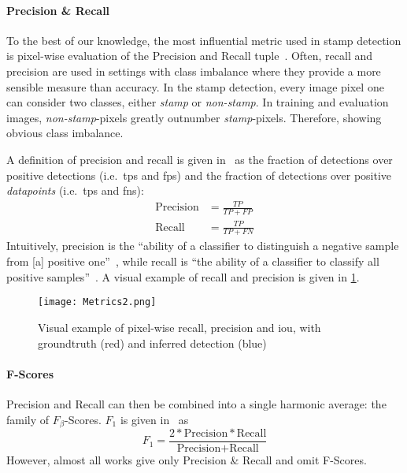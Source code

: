 \paragraph{Precision \& Recall}\label{par:precision-recall}
To the best of our knowledge, the most influential metric used in stamp 
detection is pixel-wise evaluation of the Precision and Recall
tuple~\cite{Nandedkar.2015121620151219,Younas.2017110920171115,
Ahmed.2013082520130828,Dey.2015121620151219,
Micenkova.2011091820110921, Bhalgat.20160916, Micenkova.2015,
Nandedkar.2015082320150826}. Often, recall and precision are used in settings
with class imbalance where they provide a more sensible measure than accuracy.
In the stamp detection, every image pixel one can consider two classes, either
\textit{stamp} or \textit{non-stamp}. In training and evaluation images,
\textit{non-stamp}-pixels greatly outnumber \textit{stamp}-pixels. Therefore,
showing obvious class imbalance.
\par
A definition of precision and recall is given
in~\cite[423]{Goodfellow.2016} as the fraction of 
 detections over positive detections (i.e.\ \glspl{tp} and \glspl{fp}) and the
fraction of  detections over positive \textit{datapoints}
(i.e.\ \glspl{tp} and \glspl{fn}):
\begin{align}
    \text{Precision} &= \frac{TP}{TP + FP}\\
    \text{Recall} &= \frac{TP}{TP + FN}\label{eq:precision-recall}
\end{align}
Intuitively, precision is the ``ability of a classifier to distinguish a
negative sample from [a] positive one''~\cite{Younas.2017110920171115}, while
recall is ``the ability of a classifier to classify all positive samples''~\cite{Younas.2017110920171115}.
A visual example of recall and precision is given in
\cref{fig:visual-precision-recall}.
\begin{figure}
    \center
    \texttt{[image: Metrics2.png]}
    \caption[short={Visual example of pixel-wise recall, precision and \gls{iou}}]
    {Visual example of pixel-wise recall, precision and \gls{iou}, with
    groundtruth (red) and inferred detection (blue)}\label{fig:visual-precision-recall}
\end{figure}

\paragraph{F-Scores}\label{par:f-scores}
Precision and Recall can then be combined into a single harmonic average: the
family of \(F_\beta\)-Scores. \(F_1\) is given in~\cite[424]{Goodfellow.2016} as
\begin{equation*}
    F_1=\frac{2*\text{Precision}*\text{Recall}}{\text{Precision} + \text{Recall}}
\end{equation*}
However, almost all works give only Precision \& Recall and omit F-Scores.


